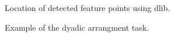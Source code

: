 \documentclass[11pt]{article}
\begin{document}
\begin{figure}%
    \centering
    \caption{Location of detected feature points using dlib.}
    \label{ftrpts}%
\end{figure}
\begin{figure}%
    \centering
    \caption{Example of the dyadic arrangment task.}
    \label{dyadic}%
\end{figure}
\end{document}
